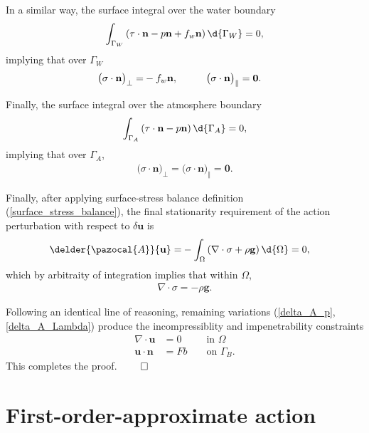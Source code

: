In a similar way, the surface integral over the water boundary
\begin{align*}
  \int_{\Gamma_W} \left( \tau \cdot \mathbf{n} - p \mathbf{n} + f_w \mathbf{n} \right) \d{\Gamma_W} = 0,
\end{align*}
implying that over $\Gamma_W$
\begin{align*}
  \big( \sigma \cdot \mathbf{n} \big)_{\perp} = 
  & - f_w \mathbf{n}, \hspace{10mm} \big( \sigma \cdot \mathbf{n} \big)_{\Vert} = \mathbf{0}.
\end{align*}

Finally, the surface integral over the atmosphere boundary
\begin{align*}
  \int_{\Gamma_A} \left( \tau \cdot \mathbf{n} - p \mathbf{n} \right) \d{\Gamma_A} = 0,
\end{align*}
implying that over $\Gamma_A$,
\begin{align*}
  \big( \sigma \cdot \mathbf{n} \big)_{\perp} = \big( \sigma \cdot \mathbf{n} \big)_{\Vert} = \mathbf{0}.
\end{align*}

Finally, after applying surface-stress balance definition (\ref{surface_stress_balance}), the final stationarity requirement of the action perturbation with respect to $\delta \mathbf{u}$ is
\begin{align*}
  \delder{\pazocal{A}}{\mathbf{u}} = 
  &- \int_{\Omega} \left( \nabla \cdot \sigma + \rho \mathbf{g} \right) \d{\Omega} = 0,
\end{align*}
which by arbitraity of integration implies that within $\Omega$,
\begin{align*}
  \nabla \cdot \sigma = -\rho \mathbf{g}.
\end{align*}

Following an identical line of reasoning, remaining variations (\ref{delta_A_p}, \ref{delta_A_Lambda}) produce the incompressiblity and impenetrability constraints
\begin{align*}
  \nabla \cdot \mathbf{u} &= 0 && \text{ in } \Omega \\
  \mathbf{u} \cdot \mathbf{n} &= Fb && \text{ on } \Gamma_B.
\end{align*}
This completes the proof. $\qed$

\section{First-order-approximate action}

